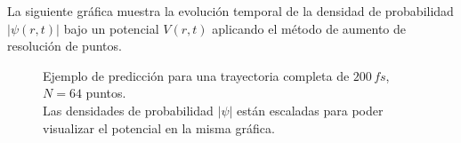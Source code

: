 La siguiente gráfica muestra la evolución temporal de la densidad de probabilidad $|\psi(r,t)|$ bajo un potencial $V(r,t)$ aplicando el método de aumento de resolución de puntos.

\begin{figure}[H]
  \centering
  \caption{Ejemplo de predicción para una trayectoria completa de $200\,fs$, $N=64$ puntos.\\ Las densidades de probabilidad $|\psi|$ están escaladas para poder visualizar el potencial en la misma gráfica.}
  \label{fig:trajec1_64}
\end{figure}
